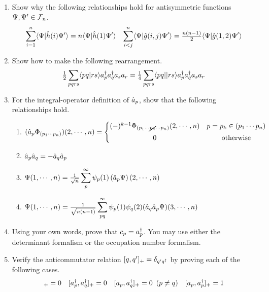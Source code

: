 \documentclass[11pt]{article}
\numberwithin{equation}{section}
\begin{document}
\begin{enumerate}
\item
  Show why the following relationships hold for antisymmetric functions $\Psi ,\Psi '\in\mathcal{F}_n$.
  \begin{align*}
    \sum_{i=1}^n
    \langle\Psi |\hat{h}(i)\Psi '\rangle
  =
    n\langle\Psi |\hat{h}(1)\Psi '\rangle
  &&
    \sum_{i<j}^n
    \langle\Psi |\hat{g}(i,j)\Psi '\rangle
  =
    \tfrac{n(n-1)}{2}
    \langle\Psi |\hat{g}(1,2)\Psi '\rangle
  \end{align*}

\item
  Show how to make the following rearrangement.
  \begin{align*}
    \tfrac{1}{2}
    \sum_{pqrs}
    \langle pq|rs\rangle
    a_p^\dagger a_q^\dagger a_s a_r
  =
    \tfrac{1}{4}
    \sum_{pqrs}
    \langle pq||rs\rangle
    a_p^\dagger a_q^\dagger a_s a_r
  \end{align*}

\item
  For the integral-operator definition of $\hat{a}_p$, show that the following relationships hold.
  \begin{enumerate}
  \item
    $
      (\op{a}_p\F_{(p_1\cd p_n)})(2,\cd,n)
    =
    \left\{
    \ar{
      (-)^{k-1}\F_{(p_1\cd \cancel{p_k}\cd p_n)}(2,\cd,n) & p=p_k\in(p_1\cd p_n)\\[5pt]
      0 & \text{otherwise}
    }
    \right.
    $

  \item
    $\hat{a}_p\hat{a}_q = - \hat{a}_q\hat{a}_p$

  \item
    ${\displaystyle
      \Psi (1,\cdots,n)
    =
      \tfrac{1}{\sqrt{n}}
      \sum_p^\infty\psi _p(1)\left(\hat{a}_p\Psi \right)(2,\cdots,n)
    }$

  \item
    ${\displaystyle
      \Psi (1,\cdots,n)
    =
      \tfrac{1}{\sqrt{n(n-1)}}
      \sum_{pq}^\infty
      \psi _p(1)\psi _q(2)(\hat{a}_q\hat{a}_p\Psi )(3,\cdots,n)
    }$
  \end{enumerate}


\item
  Using your own words, prove that $c_p=a_p^\dagger$.
  You may use either the determinant formalism or the occupation number formalism.

\item
  Verify the anticommutator relation $[q,q']_+=\delta _{q'q^\dagger}$ by proving each of the following cases.
  \begin{align*}
    [a_p, a_q]_+
  =
    0
  &&
    [a_p\dg, a_q\dg]_+
  =
    0
  &&
    [a_p, a_q\dg]_+
  =
    0
  \hspace{5pt} (p\neq q)
  &&
    [a_p, a_p\dg]_+
  =
    1
  \end{align*}


\end{enumerate}
\end{document}
